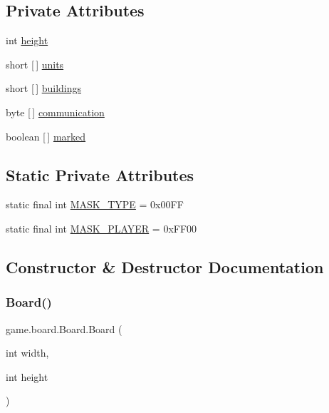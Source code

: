 \subsection*{Private Attributes}
\begin{DoxyCompactItemize}
\item 
int \mbox{\hyperlink{classgame_1_1board_1_1_board_aa8312858518138c1cc8af3dd0e823c4d}{height}}
\item 
short \mbox{[}$\,$\mbox{]} \mbox{\hyperlink{classgame_1_1board_1_1_board_a2c63c99ff5e82870b70d4b224520047e}{units}}
\item 
short \mbox{[}$\,$\mbox{]} \mbox{\hyperlink{classgame_1_1board_1_1_board_a80c3765beb7554e91aabbd09784f6632}{buildings}}
\item 
byte \mbox{[}$\,$\mbox{]} \mbox{\hyperlink{classgame_1_1board_1_1_board_a8131ce8576efce30d08ab999fa3d88bf}{communication}}
\item 
boolean \mbox{[}$\,$\mbox{]} \mbox{\hyperlink{classgame_1_1board_1_1_board_a38c4840dfa060e8b93d043f7bbc9ec10}{marked}}
\end{DoxyCompactItemize}
\subsection*{Static Private Attributes}
\begin{DoxyCompactItemize}
\item 
static final int \mbox{\hyperlink{classgame_1_1board_1_1_board_ad97ae59e983fdcc5bbb1aed0a7fe0989}{M\+A\+S\+K\+\_\+\+T\+Y\+PE}} = 0x00\+FF
\item 
static final int \mbox{\hyperlink{classgame_1_1board_1_1_board_a0e561d91177295437581d315b22f8eb9}{M\+A\+S\+K\+\_\+\+P\+L\+A\+Y\+ER}} = 0x\+F\+F00
\end{DoxyCompactItemize}


\subsection{Constructor \& Destructor Documentation}
\mbox{\label{classgame_1_1board_1_1_board_a4a4512e961aaf295bb4227f6f3fc7981}} 
\subsubsection{\texorpdfstring{Board()}{Board()}\hspace{0.1cm}{\footnotesize\ttfamily [1/2]}}
{\footnotesize\ttfamily game.\+board.\+Board.\+Board (\begin{DoxyParamCaption}\item[{int}]{width,  }\item[{int}]{height }\end{DoxyParamCaption})\hspace{0.3cm}{\ttfamily [inline]}}


